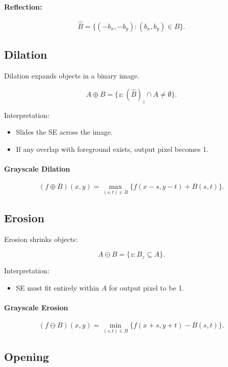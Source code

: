\documentclass{AnantDocumentation}
\begin{document}
\paragraph{Reflection:}
\[
\hat{B} = \{(-b_x,-b_y) : (b_x,b_y) \in B\}.
\]

\subsection{Dilation}

Dilation expands objects in a binary image.

\[
A \oplus B = \{ z : (\hat{B})_z \cap A \neq \emptyset \}.
\]

Interpretation:
\begin{itemize}
\item Slides the SE across the image.
\item If any overlap with foreground exists, output pixel becomes 1.
\end{itemize}

\paragraph{Grayscale Dilation}

\[
(f \oplus B)(x,y) = \max_{(s,t) \in B} \{ f(x-s, y-t) + B(s,t) \}.
\]

\subsection{Erosion}

Erosion shrinks objects:

\[
A \ominus B = \{ z : B_z \subseteq A \}.
\]

Interpretation:
\begin{itemize}
\item SE must fit entirely within $A$ for output pixel to be 1.
\end{itemize}

\paragraph{Grayscale Erosion}

\[
(f \ominus B)(x,y) = \min_{(s,t) \in B} \{ f(x+s,y+t) - B(s,t) \}.
\]

\subsection{Opening}
\end{document}
